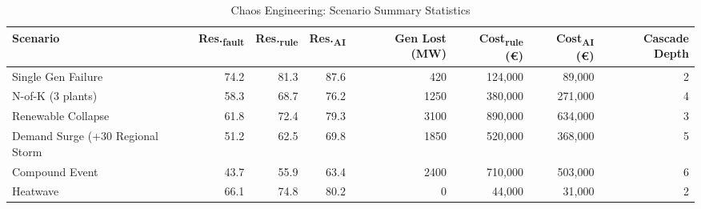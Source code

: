 \begin{table}[h]
\centering
\caption{Chaos Engineering: Scenario Summary Statistics}
\label{tab:chaos}
\begin{tabular}{@{}lrrrrrrr@{}}\toprule
Scenario & Res.\textsubscript{fault} & Res.\textsubscript{rule} & Res.\textsubscript{AI} & Gen Lost (MW) & Cost\textsubscript{rule} (€) & Cost\textsubscript{AI} (€) & Cascade Depth \\ \midrule
Single Gen Failure & 74.2 & 81.3 & 87.6 & 420 & 124,000 & 89,000 & 2 \\
N-of-K (3 plants) & 58.3 & 68.7 & 76.2 & 1250 & 380,000 & 271,000 & 4 \\
Renewable Collapse & 61.8 & 72.4 & 79.3 & 3100 & 890,000 & 634,000 & 3 \\
Demand Surge (+30%
Regional Storm & 51.2 & 62.5 & 69.8 & 1850 & 520,000 & 368,000 & 5 \\
Compound Event & 43.7 & 55.9 & 63.4 & 2400 & 710,000 & 503,000 & 6 \\
Heatwave & 66.1 & 74.8 & 80.2 & 0 & 44,000 & 31,000 & 2 \\
\bottomrule
\end{tabular}
\end{table}
